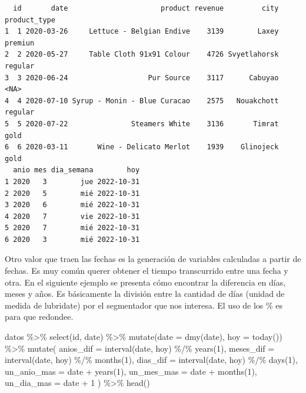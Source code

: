 \documentclass[
  letterpaper,
  DIV=11,
  numbers=noendperiod]{scrreprt}
\newenvironment{Shaded}{\begin{snugshade}}{\end{snugshade}}
\newcommand{\AttributeTok}[1]{\textcolor[rgb]{0.40,0.45,0.13}{#1}}
\newcommand{\DecValTok}[1]{\textcolor[rgb]{0.68,0.00,0.00}{#1}}
\newcommand{\FunctionTok}[1]{\textcolor[rgb]{0.28,0.35,0.67}{#1}}
\newcommand{\NormalTok}[1]{\textcolor[rgb]{0.00,0.23,0.31}{#1}}
\newcommand{\SpecialCharTok}[1]{\textcolor[rgb]{0.37,0.37,0.37}{#1}}
\begin{document}
\begin{verbatim}
  id       date                      product revenue         city product_type
1  1 2020-03-26     Lettuce - Belgian Endive    3139        Laxey      premiun
2  2 2020-05-27     Table Cloth 91x91 Colour    4726 Svyetlahorsk      regular
3  3 2020-06-24                   Pur Source    3117      Cabuyao         <NA>
4  4 2020-07-10 Syrup - Monin - Blue Curacao    2575   Nouakchott      regular
5  5 2020-07-22               Steamers White    3136       Timrat         gold
6  6 2020-03-11       Wine - Delicato Merlot    1939    Glinojeck         gold
  anio mes dia_semana        hoy
1 2020   3        jue 2022-10-31
2 2020   5        mié 2022-10-31
3 2020   6        mié 2022-10-31
4 2020   7        vie 2022-10-31
5 2020   7        mié 2022-10-31
6 2020   3        mié 2022-10-31
\end{verbatim}

Otro valor que traen las fechas es la generación de variables calculadas
a partir de fechas. Es muy común querer obtener el tiempo transcurrido
entre una fecha y otra. En el siguiente ejemplo se presenta cómo
encontrar la diferencia en días, meses y años. Es básicamente la
división entre la cantidad de días (unidad de medida de lubridate) por
el segmentador que nos interesa. El uso de los \% es para que redondee.

\begin{Shaded}
\begin{Highlighting}[]
\NormalTok{datos }\SpecialCharTok{\%\textgreater{}\%} 
  \FunctionTok{select}\NormalTok{(id, date) }\SpecialCharTok{\%\textgreater{}\%} 
  \FunctionTok{mutate}\NormalTok{(}\AttributeTok{date =} \FunctionTok{dmy}\NormalTok{(date), }\AttributeTok{hoy =} \FunctionTok{today}\NormalTok{()) }\SpecialCharTok{\%\textgreater{}\%}
  \FunctionTok{mutate}\NormalTok{(}
    \AttributeTok{anios\_dif =} \FunctionTok{interval}\NormalTok{(date, hoy) }\SpecialCharTok{\%/\%} \FunctionTok{years}\NormalTok{(}\DecValTok{1}\NormalTok{),}
    \AttributeTok{meses\_dif =} \FunctionTok{interval}\NormalTok{(date, hoy) }\SpecialCharTok{\%/\%} \FunctionTok{months}\NormalTok{(}\DecValTok{1}\NormalTok{),}
    \AttributeTok{dias\_dif =} \FunctionTok{interval}\NormalTok{(date, hoy) }\SpecialCharTok{\%/\%} \FunctionTok{days}\NormalTok{(}\DecValTok{1}\NormalTok{),}
    \AttributeTok{un\_anio\_mas =}\NormalTok{ date }\SpecialCharTok{+} \FunctionTok{years}\NormalTok{(}\DecValTok{1}\NormalTok{),}
    \AttributeTok{un\_mes\_mas =}\NormalTok{ date }\SpecialCharTok{+} \FunctionTok{months}\NormalTok{(}\DecValTok{1}\NormalTok{),}
    \AttributeTok{un\_dia\_mas =}\NormalTok{ date }\SpecialCharTok{+} \DecValTok{1}
\NormalTok{  ) }\SpecialCharTok{\%\textgreater{}\%} 
  \FunctionTok{head}\NormalTok{()}
\end{Highlighting}
\end{Shaded}
\end{document}
